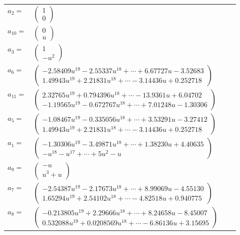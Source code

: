 \documentclass[1p]{elsarticle_modified}
\theoremstyle{definition}
\begin{document}
\begin{tabular}{m{7pt} m{180pt} m{7pt} m{180pt} }
\flushright $a_{2}=$&$\begin{pmatrix}1\\0\end{pmatrix}$ \\
\flushright $a_{10}=$&$\begin{pmatrix}0\\u\end{pmatrix}$ \\
\flushright $a_{3}=$&$\begin{pmatrix}1\\- u^2\end{pmatrix}$ \\
\flushright $a_{6}=$&$\begin{pmatrix}-2.58409 u^{19}-2.55337 u^{18}+\cdots+6.67727 u-3.52683\\1.49943 u^{19}+2.21831 u^{18}+\cdots-3.14436 u+0.252718\end{pmatrix}$ \\
\flushright $a_{11}=$&$\begin{pmatrix}2.32765 u^{19}+0.794396 u^{18}+\cdots-13.9361 u+6.04702\\-1.19565 u^{19}-0.672767 u^{18}+\cdots+7.01248 u-1.30306\end{pmatrix}$ \\
\flushright $a_{5}=$&$\begin{pmatrix}-1.08467 u^{19}-0.335056 u^{18}+\cdots+3.53291 u-3.27412\\1.49943 u^{19}+2.21831 u^{18}+\cdots-3.14436 u+0.252718\end{pmatrix}$ \\
\flushright $a_{1}=$&$\begin{pmatrix}-1.30306 u^{19}-3.49871 u^{18}+\cdots+1.38230 u+4.40635\\- u^{18}- u^{17}+\cdots+5 u^2- u\end{pmatrix}$ \\
\flushright $a_{9}=$&$\begin{pmatrix}- u\\u^3+u\end{pmatrix}$ \\
\flushright $a_{7}=$&$\begin{pmatrix}-2.54387 u^{19}-2.17673 u^{18}+\cdots+8.99069 u-4.55130\\1.65294 u^{19}+2.54102 u^{18}+\cdots-4.82518 u+0.940775\end{pmatrix}$ \\
\flushright $a_{8}=$&$\begin{pmatrix}-0.213805 u^{19}+2.29666 u^{18}+\cdots+8.24658 u-8.45007\\0.532088 u^{19}+0.0208569 u^{18}+\cdots-6.86136 u+3.15695\end{pmatrix}$ \\

\end{tabular}
\end{document}
